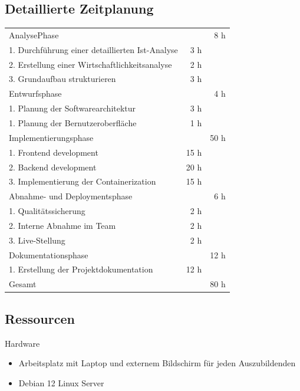 \documentclass[12pt, ngerman, a4paper,toc=left, parskip=half, numbers=noenddot, headings=standardclasses, nonumberlist]{scrartcl}
\begin{document}
\subsection{Detaillierte Zeitplanung}\label{A1}
\begin{table}[h]
	\begin{center}
		\begin{tabular}{l r r}	
			\rowcolor{blue!20}
			AnalysePhase 			       					&  		&  8 h  \\
			1. Durchführung einer detaillierten Ist-Analyse &  3 h 	&       \\
			2. Erstellung einer Wirtschaftlichkeitsanalyse 	&  2 h 	& 		\\
			3. Grundaufbau strukturieren 					&  3 h	& 		\\
			\rowcolor{blue!20}
			Entwurfsphase   		    					&  		&  4 h  \\
			1. Planung der Softwarearchitektur  			&  3 h  &	 	\\ 
			1. Planung der Bernutzeroberfläche  			&  1 h  &	 	\\ 
			\rowcolor{blue!20}
			Implementierungsphase    						&       & 50 h  \\	
			1. Frontend development 						& 15 h	& 		\\
			2. Backend development  						& 20 h  & 		\\
			3. Implementierung der Containerization  		& 15 h 	& 		\\
			\rowcolor{blue!20}
			Abnahme- und Deploymentsphase  					&      	&  6 h	\\
			1. Qualitätssicherung 							&  2 h 	& 		\\
			2. Interne Abnahme im Team  					&  2 h 	& 		\\
			3. Live-Stellung  								&  2 h 	& 		\\ 
			\rowcolor{blue!20}
			Dokumentationsphase			  					&     	& 12 h	\\
			1. Erstellung der Projektdokumentation  		& 12 h 	& 		\\
			\midrule
			\rowcolor{blue!20}
			Gesamt						   					&     	& 80 h	\\
		\end{tabular}
	\end{center}
\end{table}

\subsection{Ressourcen}\label{A2}
Hardware
\begin{itemize}
  \item Arbeitsplatz mit Laptop und externem Bildschirm für jeden Auszubildenden
  \item Debian 12 Linux Server
\end{itemize}
\end{document}
